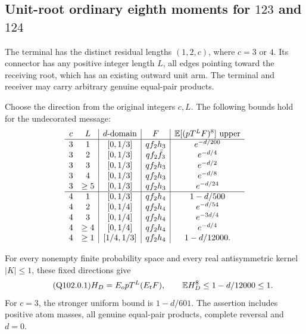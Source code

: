 \subsection{Unit-root ordinary eighth moments for \(123\) and \(124\)}
\label{proof:Q5-C102}
The terminal has the distinct residual lengths \((1,2,c)\),
where \(c=3\) or \(4\). Its connector has any positive integer
length \(L\), all edges pointing toward the receiving root,
which has an existing outward unit arm. The terminal and
receiver may carry arbitrary genuine equal-pair products.

Choose the direction from the original integers \(c,L\).
The following bounds hold for the undecorated message:
\[
\begin{array}{cc|c|c|c}
c&L&d\text{-domain}&F&\mathbb E[(pT^LF)^8]\text{ upper}\\\hline
3&1&[0,1/3]&qf_2h_3&e^{-d/200}\\
3&2&[0,1/3]&qf_2\bar f_3&e^{-d/4}\\
3&3&[0,1/3]&qf_2h_3&e^{-d/2}\\
3&4&[0,1/3]&qf_2h_3&e^{-d/8}\\
3&\ge5&[0,1/3]&qf_2h_3&e^{-d/24}\\\hline
4&1&[0,1/3]&qf_2h_4&1-d/500\\
4&2&[0,1/4]&qf_2h_4&e^{-d/54}\\
4&3&[0,1/4]&qf_2h_4&e^{-3d/4}\\
4&\ge4&[0,1/4]&qf_2h_4&e^{-d/4}\\
4&\ge1&[1/4,1/3]&qf_2h_4&1-d/12000 .
\end{array}
\]

\begin{proposition}\label{prop:Q102:ordinary-eighth}
For every nonempty finite probability space and every real
antisymmetric kernel \(|K|\le1\), these fixed directions give
\begin{equation}\tag{Q102.0.1}\label{eq:Q102:0.1}
 H_D=E_opT^L(E_tF),\qquad \mathbb E H_D^8\le1-d/12000\le1 .
\end{equation}
For \(c=3\), the stronger uniform bound is \(1-d/601\).
The assertion includes positive atom masses, all genuine
equal-pair products, complete reversal and \(d=0\).
\end{proposition}

